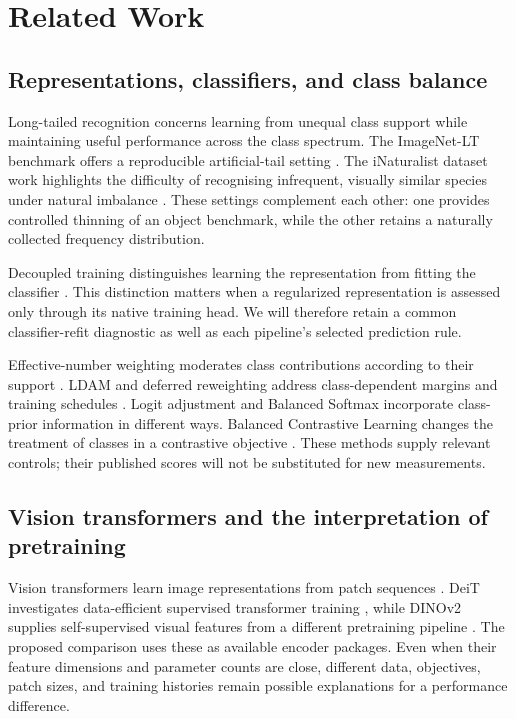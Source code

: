 \documentclass[conference]{IEEEtran}
\begin{document}
\section{Related Work}
\subsection{Representations, classifiers, and class balance}
Long-tailed recognition concerns learning from unequal class support while maintaining useful performance across the class spectrum. The ImageNet-LT benchmark offers a reproducible artificial-tail setting \cite{liu2019oltr}. The iNaturalist dataset work highlights the difficulty of recognising infrequent, visually similar species under natural imbalance \cite{vanhorn2018inat}. These settings complement each other: one provides controlled thinning of an object benchmark, while the other retains a naturally collected frequency distribution.

Decoupled training distinguishes learning the representation from fitting the classifier \cite{kang2020decoupling}. This distinction matters when a regularized representation is assessed only through its native training head. We will therefore retain a common classifier-refit diagnostic as well as each pipeline's selected prediction rule.

Effective-number weighting moderates class contributions according to their support \cite{cui2019classbalanced}. LDAM and deferred reweighting address class-dependent margins and training schedules \cite{cao2019ldam}. Logit adjustment \cite{menon2021logit} and Balanced Softmax \cite{ren2020balanced} incorporate class-prior information in different ways. Balanced Contrastive Learning changes the treatment of classes in a contrastive objective \cite{zhu2022balanced}. These methods supply relevant controls; their published scores will not be substituted for new measurements.

\subsection{Vision transformers and the interpretation of pretraining}
Vision transformers learn image representations from patch sequences \cite{dosovitskiy2021vit}. DeiT investigates data-efficient supervised transformer training \cite{touvron2021deit}, while DINOv2 supplies self-supervised visual features from a different pretraining pipeline \cite{oquab2023dinov2}. The proposed comparison uses these as available encoder packages. Even when their feature dimensions and parameter counts are close, different data, objectives, patch sizes, and training histories remain possible explanations for a performance difference.
\end{document}

